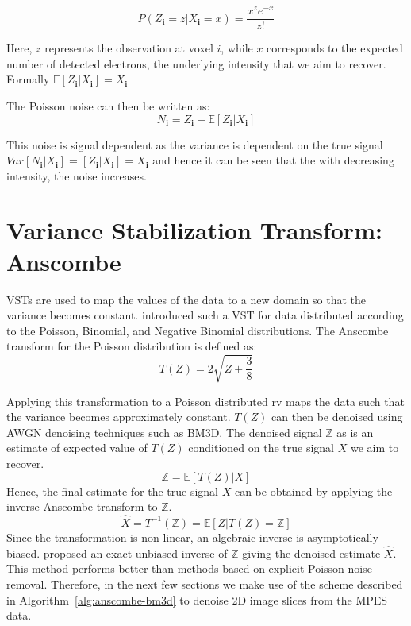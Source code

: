 \begin{equation}
    P(Z_{\mathbf{i}} = z| X_{\mathbf{i}} = x) = \frac{x^z e^{-x}}{z!}
\end{equation}


Here, $z$ represents the observation at voxel $i$, while $x$ corresponds to the expected number of detected electrons, the underlying intensity that we aim to recover. Formally $\mathbb{E}[Z_{\mathbf{i}} | X_{\mathbf{i}}] = X_{\mathbf{i}}$

The Poisson noise can then be written as:
\begin{equation}
    N_{\mathbf{i}} = Z_{\mathbf{i}} - \mathbb{E}[Z_{\mathbf{i}} | X_{\mathbf{i}}]
\end{equation}

This noise is signal dependent as the variance is dependent on the true signal $Var[N_{\mathbf{i}} | X_{\mathbf{i}}] = [Z_{\mathbf{i}} | X_{\mathbf{i}}] = X_{\mathbf{i}}$ and hence it can be seen that the with decreasing intensity, the noise increases.

\section{Variance Stabilization Transform: Anscombe}

\Glspl{VST} are used to map the values of the data to a new domain so that the variance becomes constant. \citeauthor{anscombeTransformationPoissonBinomial1948} \cite{anscombeTransformationPoissonBinomial1948} introduced such a \gls{VST} for data distributed according to the Poisson, Binomial, and Negative Binomial distributions. The Anscombe transform for the Poisson distribution is defined as:
\begin{equation}
    T(Z) = 2 \sqrt{Z + \frac{3}{8}}
\end{equation}

Applying this transformation to a Poisson distributed \gls{rv} maps the data such that the variance becomes approximately constant. $T(Z)$ can then be denoised using \gls{AWGN} denoising techniques such as \gls{BM3D}. 
The denoised signal $\mathbb{Z}$ as is an estimate of expected value of $T(Z)$ conditioned on the true signal $X$ we aim to recover.
\begin{equation}
    \mathbb{Z} = \mathbb{E}[T(Z) | X]
\end{equation}
Hence, the final estimate for the true signal $X$ can be obtained by applying the inverse Anscombe transform to $\mathbb{Z}$.
\begin{equation}
    \hat{X} = T^{-1}(\mathbb{Z}) = \mathbb{E}[Z | T(Z) = \mathbb{Z}]
\end{equation}
Since the transformation is non-linear, an algebraic inverse is asymptotically biased. \citeauthor{makitaloOptimalInversionAnscombe2011} \cite{makitaloOptimalInversionAnscombe2011} proposed an exact unbiased inverse of $\mathbb{Z}$ giving the denoised estimate $\hat{X}$. This method performs better than methods based on explicit Poisson noise removal. Therefore, in the next few sections we make use of the scheme described in Algorithm~\ref{alg:anscombe-bm3d} to denoise 2D image slices from the \gls{MPES} data.

